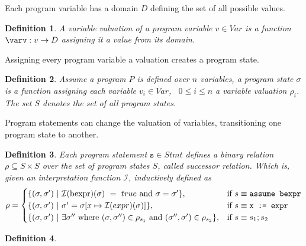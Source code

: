 \documentclass{article}
\newcommand{\Var}{\ensuremath{\mathit{Var}}\xspace}
\newcommand{\stmt}{\ensuremath{\mathit{Stmt}}\xspace}
\newtheorem{mydef}{Definition}
\newcommand\mycom[1]{}
\newcommand\mycom[1]{#1}
\newcommand{\jw}[1]{\mycom{\todo[color=blue!40,inline]{\small JW: #1}}}
\newcommand{\dd}[1]{\mycom{\todo[color=orange!40,inline]{\small DD: #1}}}
\newcommand{\ts}[1]{\mycom{\todo[color=green!40,inline]{\small TS: #1}}}
\begin{document}
Each program variable has a domain $D$ defining the set of all possible values.
\begin{mydef}
	A variable valuation of a program variable $v \in \Var$ is a function $\varv: v \rightarrow D$  assigning it a value from its domain.
\end{mydef}
Assigning every program variable a valuation creates a program state.


\begin{mydef}
	Assume a program $P$ is defined over $n$ variables, a program state $\sigma$ is a function assigning each variable $v_i \in \Var$, \ $0 \leq i \leq n$ a variable valuation $\rho_i$. The set $S$ denotes the set of all program states.
\end{mydef}

Program statements can change the valuation of variables, transitioning one program state to another.

\begin{mydef}
	Each program statement $\texttt{s} \in \stmt$ defines a binary relation $\rho \subseteq S \times S$ over the set of program states $S$, called successor relation. Which is, given an interpretation function $\mathcal{I}$, inductively defined as
	$$ \rho =
		\begin{cases}
			\{(\sigma, \sigma')\ |\ \mathcal{I}(\text{bexpr})(\sigma)\ =\ true\ \text{and}\ \sigma = \sigma'\} ,                                          & \text{if}\ s \equiv \text{\texttt{assume bexpr}} \\
			\{(\sigma, \sigma')\ |\ \sigma' = \sigma[x \mapsto \mathcal{I}(expr)(\sigma)]\} ,                                                             & \text{if}\ s \equiv \texttt{x := expr}           \\
			\{(\sigma, \sigma')\ |\ \exists \sigma''\ \text{where}\ (\sigma, \sigma'') \in \rho_{s_1}\ \text{and}\ (\sigma'', \sigma') \in \rho_{s_2} \}, & \text{if}\ s \equiv \texttt{$s_1;s_2$}
		\end{cases}
	$$
\end{mydef}
\ts{What is an interpretation function?}
\begin{mydef}
	\jw{Sets of States.}
\end{mydef}
\end{document}
